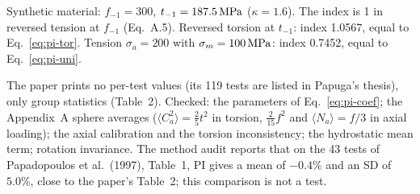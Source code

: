  Synthetic material: $f_{-1}=300$, $t_{-1}=187.5\,\mathrm{MPa}$ ($\kappa=1.6$). The index
is 1 in reversed tension at $f_{-1}$ (Eq.~A.5). Reversed torsion at $t_{-1}$: index 1.0567, equal to
Eq.~\eqref{eq:pi-tor}. Tension $\sigma_a=200$ with $\sigma_m=100\,\mathrm{MPa}$: index 0.7452, equal to
Eq.~\eqref{eq:pi-uni}.

 The paper prints no per-test values (its 119 tests are listed in Papuga's
thesis), only group statistics (Table~2). Checked: the parameters of Eq.~\eqref{eq:pi-coef}; the
Appendix~A sphere averages ($\langle C_a^2\rangle=\tfrac25t^2$ in torsion, $\tfrac{2}{15}f^2$ and
$\langle N_a\rangle=f/3$ in axial loading); the axial calibration and the torsion inconsistency;
the hydrostatic mean term; rotation invariance. The method audit reports that on the 43 tests of
Papadopoulos et al.\ (1997), Table~1, PI gives a mean of $-0.4\%$ and an SD of $5.0\%$, close to the
paper's Table~2; this comparison is not a test.
